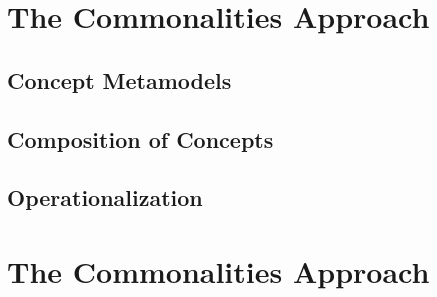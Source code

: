 \section{The Commonalities Approach}
\label{chap:improvement:commonalities}

\subsection{Concept Metamodels}

\subsection{Composition of Concepts}

\subsection{Operationalization}


\section*{The Commonalities Approach}
\label{chap:commonalities:approach}

